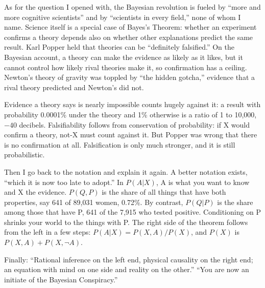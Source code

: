 As for the question I opened with, the Bayesian revolution is fueled by ``more and more cognitive scientists'' and by ``scientists in every field,'' none of whom I name. Science itself is a special case of Bayes's Theorem: whether an experiment confirms a theory depends also on whether other explanations predict the same result. Karl Popper held that theories can be ``definitely falsified.''  On the Bayesian account, a theory can make the evidence as likely as it likes, but it cannot control how likely rival theories make it, so confirmation has a ceiling. Newton's theory of gravity was toppled by ``the hidden gotcha,'' evidence that a rival theory predicted and Newton's did not. 

Evidence a theory says is nearly impossible counts hugely against it: a result with probability 0.0001\% under the theory and 1\% otherwise is a ratio of 1 to 10,000, $-40$ decibels. Falsifiability follows from conservation of probability: if X would confirm a theory, not-X must count against it. But Popper was wrong that there is no confirmation at all. Falsification is only much stronger, and it is still probabilistic.

Then I go back to the notation and explain it again. A better notation exists, ``which it is now too late to adopt.'' In $P(A|X)$, A is what you want to know and X the evidence. $P(Q,P)$ is the share of all things that have both properties, say 641 of 89,031 women, 0.72\%. By contrast, $P(Q|P)$ is the share among those that have P, 641 of the 7,915 who tested positive. Conditioning on P shrinks your world to the things with P. The right side of the theorem follows from the left in a few steps: $P(A|X) = P(X,A)/P(X)$, and $P(X)$ is $P(X,A) + P(X,\neg A)$.

Finally: ``Rational inference on the left end, physical causality on the right end; an equation with mind on one side and reality on the other.''  ``You are now an initiate of the Bayesian Conspiracy.''

